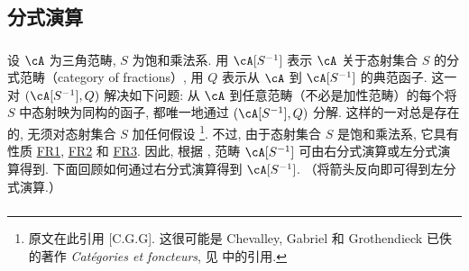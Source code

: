\subsection{分式演算}\label{VIII:2-3}

\subsubsection{}\label{VIII:2-3-1}

设 $\cA$ 为三角范畴, $S$ 为饱和乘法系. 用 $\cA[S^{-1}]$ 表示 $\cA$ 关于态射集合 $S$ 的分式范畴（category of fractions）, 用 $Q$ 表示从 $\cA$ 到 $\cA[S^{-1}]$ 的典范函子. 这一对 $(\cA[S^{-1}],Q)$ 解决如下问题: 从 $\cA$ 到任意范畴（不必是加性范畴）的每个将 $S$ 中态射映为同构的函子, 都唯一地通过 $(\cA[S^{-1}],Q)$ 分解. 这样的一对总是存在的, 无须对态射集合 $S$ 加任何假设 \cite[1.1]{gz67}\footnote{原文在此引用 [C.G.G]. 这很可能是 Chevalley, Gabriel 和 Grothendieck 已佚的著作 \emph{Catégories et foncteurs}, 见 \cite{sc72} 中的引用. }. 不过, 由于态射集合 $S$ 是饱和乘法系, 它具有性质 \hyperlink{VIII:FR1}{FR1}, \hyperlink{VIII:FR2}{FR2} 和 \hyperlink{VIII:FR3}{FR3}. 因此, 根据 \cite{gz67}, 范畴 $\cA[S^{-1}]$ 可由右分式演算或左分式演算得到. 下面回顾如何通过右分式演算得到 $\cA[S^{-1}]$. （将箭头反向即可得到左分式演算.）

\subsubsection{}\label{VIII:2-3-2}

